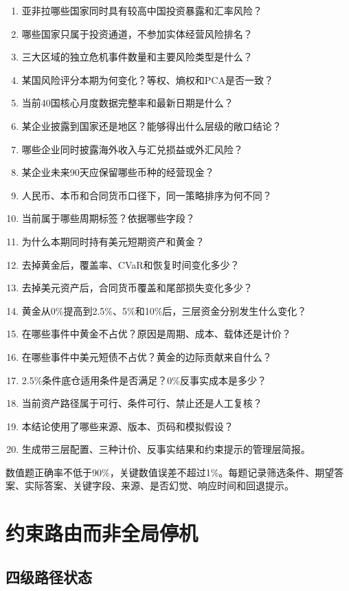 \documentclass[UTF8,fontset=windows,12pt,openany]{ctexbook}
\begin{document}
\begin{enumerate}[label=Q\arabic*.]
  \item 亚非拉哪些国家同时具有较高中国投资暴露和汇率风险？
  \item 哪些国家只属于投资通道，不参加实体经营风险排名？
  \item 三大区域的独立危机事件数量和主要风险类型是什么？
  \item 某国风险评分本期为何变化？等权、熵权和PCA是否一致？
  \item 当前40国核心月度数据完整率和最新日期是什么？
  \item 某企业披露到国家还是地区？能够得出什么层级的敞口结论？
  \item 哪些企业同时披露海外收入与汇兑损益或外汇风险？
  \item 某企业未来90天应保留哪些币种的经营现金？
  \item 人民币、本币和合同货币口径下，同一策略排序为何不同？
  \item 当前属于哪些周期标签？依据哪些字段？
  \item 为什么本期同时持有美元短期资产和黄金？
  \item 去掉黄金后，覆盖率、CVaR和恢复时间变化多少？
  \item 去掉美元资产后，合同货币覆盖和尾部损失变化多少？
  \item 黄金从0\%提高到2.5\%、5\%和10\%后，三层资金分别发生什么变化？
  \item 在哪些事件中黄金不占优？原因是周期、成本、载体还是计价？
  \item 在哪些事件中美元短债不占优？黄金的边际贡献来自什么？
  \item 2.5\%条件底仓适用条件是否满足？0\%反事实成本是多少？
  \item 当前资产路径属于可行、条件可行、禁止还是人工复核？
  \item 本结论使用了哪些来源、版本、页码和模拟假设？
  \item 生成带三层配置、三种计价、反事实结果和约束提示的管理层简报。
\end{enumerate}

数值题正确率不低于90\%，关键数值误差不超过1\%。每题记录筛选条件、期望答案、实际答案、关键字段、来源、是否幻觉、响应时间和回退提示。

\chapter{约束路由而非全局停机}

\section{四级路径状态}
\end{document}
